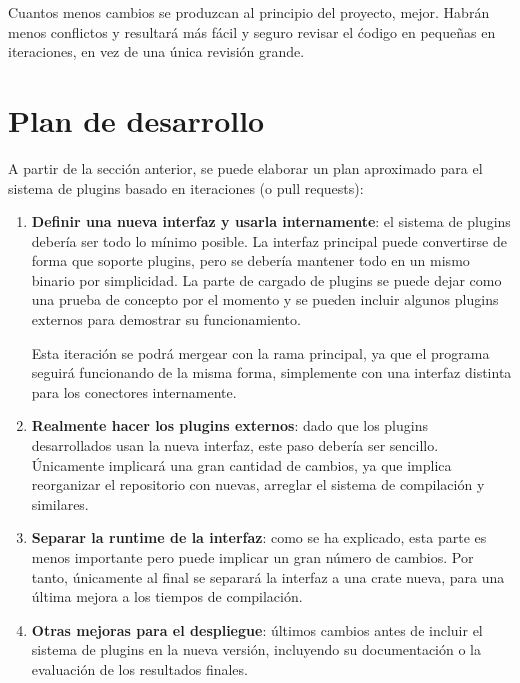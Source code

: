 Cuantos menos cambios se produzcan al principio del proyecto, mejor. Habrán
menos conflictos y resultará más fácil y seguro revisar el ćodigo en pequeñas en
iteraciones, en vez de una única revisión grande.

\section{Plan de desarrollo}

A partir de la sección anterior, se puede elaborar un plan aproximado para el
sistema de plugins basado en iteraciones (o pull requests):

\begin{enumerate}
    \item \textbf{Definir una nueva interfaz y usarla internamente}: el sistema
        de plugins debería ser todo lo mínimo posible. La interfaz principal
        puede convertirse de forma que soporte plugins, pero se debería mantener
        todo en un mismo binario por simplicidad. La parte de cargado de plugins
        se puede dejar como una prueba de concepto por el momento y se pueden
        incluir algunos plugins externos para demostrar su funcionamiento.

        Esta iteración se podrá mergear con la rama principal, ya que el
        programa seguirá funcionando de la misma forma, simplemente con una
        interfaz distinta para los conectores internamente.

    \item \textbf{Realmente hacer los plugins externos}: dado que los plugins
        desarrollados usan la nueva interfaz, este paso debería ser sencillo.
        Únicamente implicará una gran cantidad de cambios, ya que implica
        reorganizar el repositorio con \crates nuevas, arreglar el sistema de
        compilación y similares.

    \item \textbf{Separar la runtime de la interfaz}: como se ha explicado, esta
        parte es menos importante pero puede implicar un gran número de cambios.
        Por tanto, únicamente al final se separará la interfaz a una crate
         nueva, para una última mejora a los tiempos de
        compilación.

    \item \textbf{Otras mejoras para el despliegue}: últimos cambios antes de
        incluir el sistema de plugins en la nueva versión, incluyendo
        su documentación o la evaluación de los resultados finales.

\end{enumerate}

